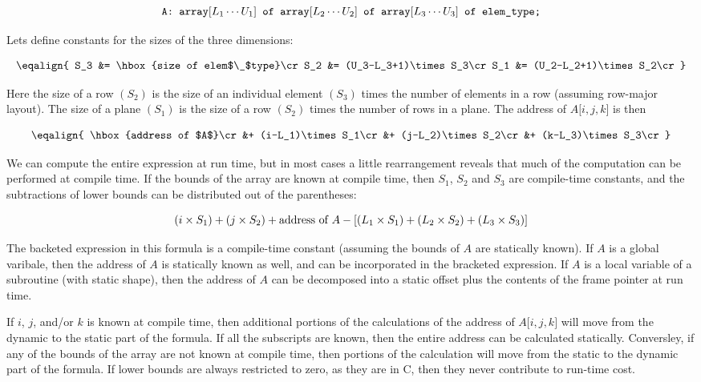 $$\hbox{{\tt A: array$\lbrack L_1\cdots U_1\rbrack$ of array$\lbrack L_2\cdots U_2\rbrack$ of array$\lbrack L_3\cdots U_3\rbrack$ of elem$\_$type;}}$$

Lets define constants for the sizes of the three dimensions:

$$\eqalign{	S_3 &= \hbox{size of elem$\_$type}\cr
		S_2 &= (U_3-L_3+1)\times S_3\cr
		S_1 &= (U_2-L_2+1)\times S_2\cr}$$

Here the size of a row $(S_2)$ is the size of an individual element $(S_3)$ times the number of elements in a row (assuming row-major layout). The size of a plane $(S_1)$ is the size of a row $(S_2)$ times the number of rows in a plane. The address of  $A\lbrack i,j,k \rbrack$  is then

$$\eqalign{	\hbox{address of $A$}\cr
		&+ (i-L_1)\times S_1\cr
		&+ (j-L_2)\times S_2\cr
		&+ (k-L_3)\times S_3\cr}$$

We can compute the entire expression at run time, but in most cases a little rearrangement reveals that much of the computation can be performed at compile time. If the bounds of the array are known at compile time, then $S_1$, $S_2$ and $S_3$ are compile-time constants, and the subtractions of lower bounds can be distributed out of the parentheses:

$$(i\times S_1)+(j\times S_2)+\hbox{address of $A$}-\lbrack (L_1\times S_1)+(L_2\times S_2)+(L_3\times S_3)\rbrack$$

The backeted expression in this formula is a compile-time constant (assuming the bounds of $A$ are statically known). If $A$ is a global varibale, then the address of $A$ is statically known as well, and can be incorporated in the bracketed expression. If $A$ is a local variable of a subroutine (with static shape), then the address of $A$ can be decomposed into a static offset plus the contents of the frame pointer at run time.

\vskip 6pt
If $i$, $j$, and/or $k$ is known at compile time, then additional portions of the calculations of the address of $A\lbrack i,j,k \rbrack$ will move from the dynamic to the static part of the formula. If all the subscripts are known, then the entire address can be calculated statically. Conversley, if any of the bounds of the array are not known at compile time, then portions of the calculation will move from the static to the dynamic part of the formula. If lower bounds are always restricted to zero, as they are in C, then they never contribute to run-time cost.

\vfill\eject
\bye
